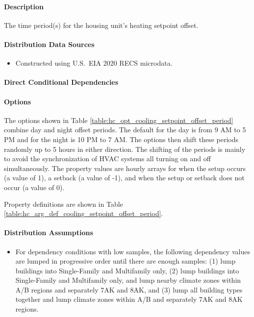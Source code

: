 \paragraph{Description}
% 
The time period(s) for the housing unit's heating setpoint offset.

\paragraph{Distribution Data Sources}
% 
\begin{itemize}
    \item Constructed using U.S.~EIA 2020 RECS microdata.
\end{itemize}

\paragraph{Direct Conditional Dependencies}


\paragraph{Options}
The options shown in Table \ref{table:hc_opt_cooling_setpoint_offset_period} combine day and night offset periods. The default for the day is from 9 AM to 5 PM and for the night is 10 PM to 7 AM. The options then shift these periods randomly up to 5 hours in either direction. The shifting of the periods is mainly to avoid the synchronization of HVAC systems all turning on and off simultaneously. The property values are hourly arrays for when the setup occurs (a value of 1), a setback (a value of -1), and when the setup or setback does not occur (a value of 0).



Property definitions are shown in Table \ref{table:hc_arg_def_cooling_setpoint_offset_period}.



\paragraph{Distribution Assumptions}
% 
\begin{itemize}
    \item For dependency conditions with low samples, the following dependency values are lumped in progressive order until there are enough samples: (1) lump buildings into Single-Family and Multifamily only, (2) lump buildings into Single-Family and Multifamily only, and lump nearby climate zones within A/B regions and separately 7AK and 8AK, and (3) lump all building types together and lump climate zones within A/B and separately 7AK and 8AK regions.
\end{itemize}
